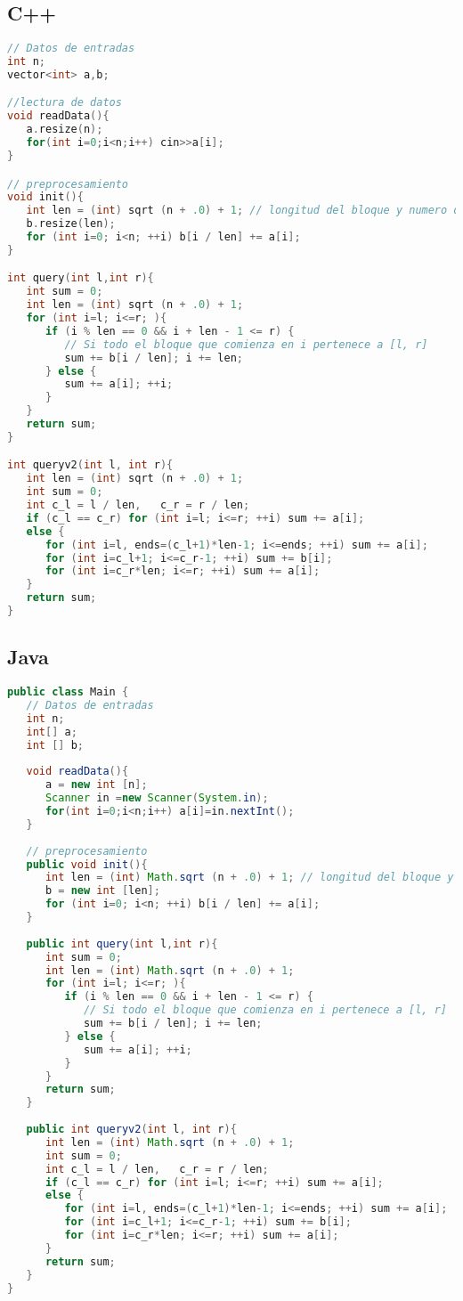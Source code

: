 \subsection{C++}
\begin{lstlisting}[language=C++]
// Datos de entradas
int n;
vector<int> a,b;

//lectura de datos
void readData(){
   a.resize(n);
   for(int i=0;i<n;i++) cin>>a[i];
}

// preprocesamiento
void init(){
   int len = (int) sqrt (n + .0) + 1; // longitud del bloque y numero de bloques
   b.resize(len);
   for (int i=0; i<n; ++i) b[i / len] += a[i];
}

int query(int l,int r){
   int sum = 0;
   int len = (int) sqrt (n + .0) + 1;
   for (int i=l; i<=r; ){
      if (i % len == 0 && i + len - 1 <= r) {
         // Si todo el bloque que comienza en i pertenece a [l, r]
         sum += b[i / len]; i += len;
      } else {
         sum += a[i]; ++i;
      }
   }
   return sum;
}

int queryv2(int l, int r){
   int len = (int) sqrt (n + .0) + 1;
   int sum = 0;
   int c_l = l / len,   c_r = r / len;
   if (c_l == c_r) for (int i=l; i<=r; ++i) sum += a[i];
   else {
      for (int i=l, ends=(c_l+1)*len-1; i<=ends; ++i) sum += a[i];
      for (int i=c_l+1; i<=c_r-1; ++i) sum += b[i];
      for (int i=c_r*len; i<=r; ++i) sum += a[i];
   }
   return sum;
}
\end{lstlisting}	

\subsection{Java}
\begin{lstlisting}[language=Java]
public class Main {
   // Datos de entradas
   int n;
   int[] a;
   int [] b;
	
   void readData(){
      a = new int [n];
      Scanner in =new Scanner(System.in);
      for(int i=0;i<n;i++) a[i]=in.nextInt();
   }
	
   // preprocesamiento
   public void init(){
      int len = (int) Math.sqrt (n + .0) + 1; // longitud del bloque y numero de bloques
      b = new int [len];
      for (int i=0; i<n; ++i) b[i / len] += a[i];
   }
	
   public int query(int l,int r){
      int sum = 0;
      int len = (int) Math.sqrt (n + .0) + 1;
      for (int i=l; i<=r; ){
         if (i % len == 0 && i + len - 1 <= r) {
            // Si todo el bloque que comienza en i pertenece a [l, r]
            sum += b[i / len]; i += len;
         } else {
            sum += a[i]; ++i;
         }
      }
      return sum;
   }
	
   public int queryv2(int l, int r){
      int len = (int) Math.sqrt (n + .0) + 1;
      int sum = 0;
      int c_l = l / len,   c_r = r / len;
      if (c_l == c_r) for (int i=l; i<=r; ++i) sum += a[i];
      else {
         for (int i=l, ends=(c_l+1)*len-1; i<=ends; ++i) sum += a[i];
         for (int i=c_l+1; i<=c_r-1; ++i) sum += b[i];
         for (int i=c_r*len; i<=r; ++i) sum += a[i];
      }
      return sum;
   }
}
\end{lstlisting}

